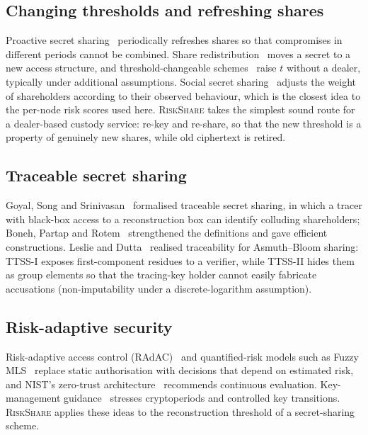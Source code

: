 \documentclass[conference]{IEEEtran}
\newcommand{\RS}{\textsc{RiskShare}}
\begin{document}
\subsection{Changing thresholds and refreshing shares}
Proactive secret sharing~\cite{herzberg1995proactive} periodically refreshes shares so that compromises in different periods cannot be combined. Share redistribution~\cite{desmedt1997redistributing,wong2002verifiable} moves a secret to a new access structure, and threshold-changeable schemes~\cite{martin1999changing,steinfeld2007lattice} raise $t$ without a dealer, typically under additional assumptions. Social secret sharing~\cite{nojoumian2010social} adjusts the weight of shareholders according to their observed behaviour, which is the closest idea to the per-node risk scores used here. \RS{} takes the simplest sound route for a dealer-based custody service: re-key and re-share, so that the new threshold is a property of genuinely new shares, while old ciphertext is retired.

\subsection{Traceable secret sharing}
Goyal, Song and Srinivasan~\cite{goyal2021traceable} formalised traceable secret sharing, in which a tracer with black-box access to a reconstruction box can identify colluding shareholders; Boneh, Partap and Rotem~\cite{boneh2024traceable} strengthened the definitions and gave efficient constructions. Leslie and Dutta~\cite{leslie2025traceable} realised traceability for Asmuth--Bloom sharing: TTSS-I exposes first-component residues to a verifier, while TTSS-II hides them as group elements so that the tracing-key holder cannot easily fabricate accusations (non-imputability under a discrete-logarithm assumption).

\subsection{Risk-adaptive security}
Risk-adaptive access control (RAdAC)~\cite{mcgraw2009radac} and quantified-risk models such as Fuzzy MLS~\cite{cheng2007fuzzymls} replace static authorisation with decisions that depend on estimated risk, and NIST's zero-trust architecture~\cite{rose2020zta} recommends continuous evaluation. Key-management guidance~\cite{barker2020keymgmt} stresses cryptoperiods and controlled key transitions. \RS{} applies these ideas to the reconstruction threshold of a secret-sharing scheme.
\end{document}
